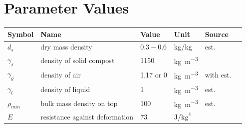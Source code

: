 \documentclass[12pt, letterpaper, titlepage]{article}
\begin{document}
\section{Parameter Values}
  \label{table-1}
\begin{center}
    \begin{tabular}{ | l | p{3.5cm}| l |l|l|l|} 
    \hline
    Symbol & Name & Value & Unit & Source\\ \hline
    $d_s$ & dry mass density &  $0.3-0.6$  & kg/kg & est.\\ \hline
    $\gamma_s$ & density of solid compost  & 1150 & \si{\kg\per\m\cubed} & \cite{burning}  \\ \hline
    $\gamma_g$ & density of air & 1.17 or 0 & \si{\kg\per\m\cubed} & \cite{burning} with est. \\ \hline
    $\gamma_l$ & density of liquid & 1 & \si{\kg\per\m\cubed} & est.  \\ \hline
    $\rho_{min}$ & bulk mass density on top & 100 & \si{\kg\per\m\cubed} & est. \\ \hline
    $E$ & resistance against deformation  & $73$ & $ \si{\J\per\kg}^4$ & \cite{pile} \\ \hline
    \end{tabular}
\end{center}
\newpage
{} \label{table-2}
\end{document}
